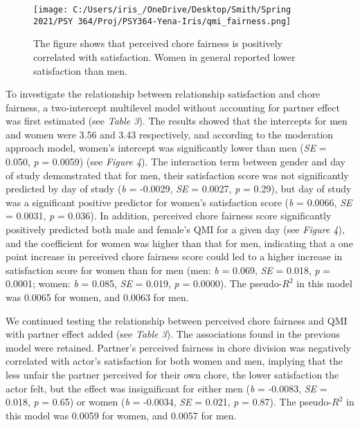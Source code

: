 \documentclass[
  english,
  man]{apa6}
\begin{document}
\begin{figure}
\centering
\texttt{[image: C:/Users/iris\_/OneDrive/Desktop/Smith/Spring 2021/PSY 364/Proj/PSY364-Yena-Iris/qmi\_fairness.png]}
\caption{The figure shows that perceived chore fairness is positively correlated with satisfaction. Women in general reported lower satisfaction than men.}
\end{figure}

To investigate the relationship between relationship satisfaction and chore fairness, a two-intercept multilevel model without accounting for partner effect was first estimated (see \emph{Table 3}). The results showed that the intercepts for men and women were 3.56 and 3.43 respectively, and according to the moderation approach model, women's intercept was significantly lower than men (\emph{SE} = 0.050, \emph{p} = 0.0059) (see \emph{Figure 4}). The interaction term between gender and day of study demonstrated that for men, their satisfaction score was not significantly predicted by day of study (\emph{b} = -0.0029, \emph{SE} = 0.0027, \emph{p} = 0.29), but day of study was a significant positive predictor for women's satisfaction score (\emph{b} = 0.0066, \emph{SE} = 0.0031, \emph{p} = 0.036). In addition, perceived chore fairness score significantly positively predicted both male and female's QMI for a given day (see \emph{Figure 4}), and the coefficient for women was higher than that for men, indicating that a one point increase in perceived chore fairness score could led to a higher increase in satisfaction score for women than for men (men: \emph{b} = 0.069, \emph{SE} = 0.018, \emph{p} = 0.0001; women: \emph{b} = 0.085, \emph{SE} = 0.019, \emph{p} = 0.0000). The pseudo-\(R^2\) in this model was 0.0065 for women, and 0.0063 for men.

We continued testing the relationship between perceived chore fairness and QMI with partner effect added (see \emph{Table 3}). The associations found in the previous model were retained. Partner's perceived fairness in chore division was negatively correlated with actor's satisfaction for both women and men, implying that the less unfair the partner perceived for their own chore, the lower satisfaction the actor felt, but the effect was insignificant for either men (\emph{b} = -0.0083, \emph{SE} = 0.018, \emph{p} = 0.65) or women (\emph{b} = -0.0034, \emph{SE} = 0.021, \emph{p} = 0.87). The pseudo-\(R^2\) in this model was 0.0059 for women, and 0.0057 for men.
\end{document}
